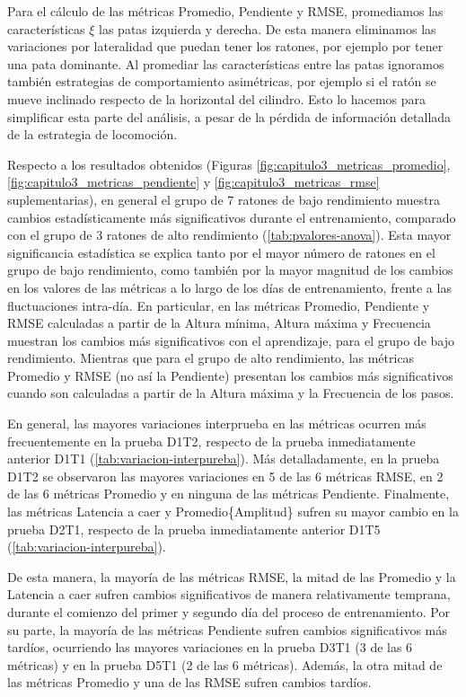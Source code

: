 Para el cálculo de las métricas Promedio, Pendiente y RMSE, promediamos las características $\xi$ las patas izquierda y derecha. De esta manera eliminamos las variaciones por lateralidad que puedan tener los ratones, por ejemplo por tener una pata dominante. Al promediar las características entre las patas ignoramos también estrategias de comportamiento asimétricas, por ejemplo si el ratón se mueve inclinado respecto de la horizontal del cilindro. Esto lo hacemos para simplificar esta parte del análisis, a pesar de la pérdida de información detallada de la estrategia de locomoción.

Respecto a los resultados obtenidos (Figuras \ref{fig:capitulo3_metricas_promedio}, \ref{fig:capitulo3_metricas_pendiente} y \ref{fig:capitulo3_metricas_rmse} suplementarias), en general el grupo de 7 ratones de bajo rendimiento muestra cambios estadísticamente más significativos durante el entrenamiento, comparado con el grupo de 3 ratones de alto rendimiento (\autoref{tab:pvalores-anova}). Esta mayor significancia estadística se explica tanto por el mayor número de ratones en el grupo de bajo rendimiento, como también por la mayor magnitud de los cambios en los valores de las métricas a lo largo de los días de entrenamiento, frente a las fluctuaciones intra-día. En particular, en las métricas Promedio, Pendiente y RMSE calculadas a partir de la Altura mínima, Altura máxima y Frecuencia muestran los cambios más significativos con el aprendizaje, para el grupo de bajo rendimiento. Mientras que para el grupo de alto rendimiento, las métricas Promedio y RMSE (no así la Pendiente) presentan los cambios más significativos cuando son calculadas a partir de la Altura máxima y la Frecuencia de los pasos.

En general, las mayores variaciones interprueba en las métricas ocurren más frecuentemente en la prueba D1T2, respecto de la prueba inmediatamente anterior D1T1 (\autoref{tab:variacion-interpureba}). Más detalladamente, en la prueba D1T2 se observaron las mayores variaciones en 5 de las 6 métricas RMSE, en 2 de las 6 métricas Promedio y en ninguna de las métricas Pendiente. Finalmente, las métricas Latencia a caer y Promedio\{Amplitud\} sufren su mayor cambio en la prueba D2T1, respecto de la prueba inmediatamente anterior D1T5 (\autoref{tab:variacion-interpureba}).

De esta manera, la mayoría de las métricas RMSE, la mitad de las Promedio y la Latencia a caer sufren cambios significativos de manera relativamente temprana, durante el comienzo del primer y segundo día del proceso de entrenamiento. Por su parte, la mayoría de las métricas Pendiente sufren cambios significativos más tardíos, ocurriendo las mayores variaciones en la prueba D3T1 (3 de las 6 métricas) y en la prueba D5T1 (2 de las 6 métricas). Además, la otra mitad de las métricas Promedio y una de las RMSE sufren cambios tardíos.

